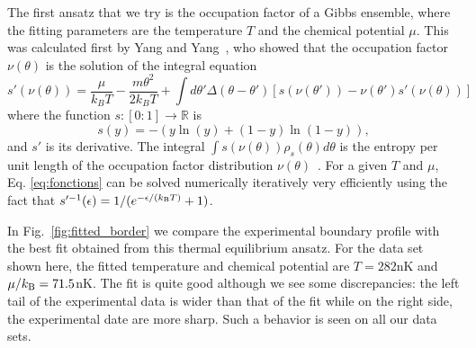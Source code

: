 The first ansatz that we try is the occupation factor of a Gibbs ensemble, where the fitting parameters are the temperature $T$ and the chemical potential $\mu$. This was calculated first by Yang and Yang~\cite{yang1969thermodynamics}, who showed that the occupation factor $\nu(\theta)$ is the solution of the integral equation
\begin{equation}
\label{eq:fonctions}
     s'(\nu(\theta)) =  \frac{\mu}{k_B T} -\frac{m\theta^2}{2k_B T}  + \int d\theta' \Delta(\theta-\theta')
    \left [ s(\nu(\theta')) - \nu(\theta')s'(\nu(\theta)) \right ]
\end{equation}
where the function $s:[0:1]\rightarrow {\mathbb R}$ is
\begin{equation}
    s(y)=  -\left( y\ln(y) +(1-y)\ln(1-y) \right ),
  \label{eq:stherm}
\end{equation}
and $s'$ is its derivative. The integral $\int s(\nu(\theta))  
\rho_s(\theta) d\theta $ is the entropy per unit length of the occupation factor distribution $\nu(\theta)$~\cite{yang1969thermodynamics}.
For a given $T$ and $\mu$, Eq. \eqref{eq:fonctions} can be solved numerically iteratively very efficiently using the fact that 
$s'^{-1}(\epsilon)=1/(e^{-\epsilon/(k_{\rm B} T)}+1)$.



In Fig.~\ref{fig:fitted_border} we compare the experimental boundary profile with the best fit obtained from this thermal equilibrium ansatz. For the data set shown here, the fitted temperature and chemical potential are 
$T=282$nK and $\mu / k_{\rm B}=71.5$nK. 
The fit is quite good although we see some discrepancies: the left tail of the experimental data is wider than that of the fit while on the right side, the experimental date are more sharp. Such a behavior is seen on all our data sets.


